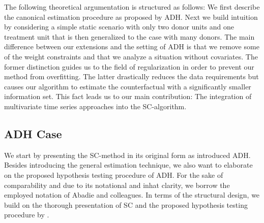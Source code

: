 The following theoretical argumentation is structured as follows: We first describe the canonical estimation procedure as proposed by \ac{ADH}. Next we build intuition by considering a simple static scenario with only two donor units and one treatment unit that is then generalized to the case with many donors. The main difference between our extensions and the setting of \ac{ADH} is that we remove some of the weight constraints and that we analyze a situation without covariates. The former distinction guides us to the field of regularization in order to prevent our method from overfitting. The latter drastically reduces the data requirements but causes our algorithm to estimate the counterfactual with a significantly smaller information set. This fact leads us to our main contribution: The integration of  multivariate time series approaches into the \ac{SC}-algorithm. 

\subsection{ADH Case}
We start by presenting the \ac{SC}-method in its original form as introduced \ac{ADH}. Besides introducing the general estimation technique, we also want to elaborate on the proposed hypothesis testing procedure of \ac{ADH}. For the sake of comparability and due to its notational and inhat clarity, we borrow the employed notation of Abadie and colleagues. In terms of the structural design, we build on the thorough presentation of \ac{SC} and the proposed hypothesis testing procedure by \cite{firpo:2018}.

